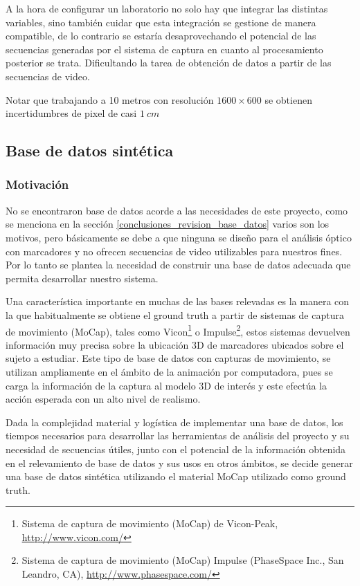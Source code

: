 A la hora de configurar un laboratorio no solo hay que integrar las distintas variables, sino también cuidar que esta integración se gestione de manera compatible, de lo contrario se estaría desaprovechando el potencial de las secuencias generadas por el sistema de captura en cuanto al procesamiento posterior se trata. Dificultando la tarea de obtención de datos a partir de las secuencias de video.

Notar que trabajando a 10 metros con resolución $1600\times600$ se obtienen incertidumbres de pixel de casi $1 ~cm $

\subsection{Base de datos sintética} \label{seccion_Base_Datos_Sintetica}
\subsubsection{Motivación}

No se encontraron base de datos acorde a las necesidades de este proyecto, como se menciona en la sección \ref{conclusiones_revision_base_datos} varios son los motivos, pero básicamente se debe a que ninguna se diseño para el análisis óptico  con marcadores y no ofrecen secuencias de video utilizables para nuestros fines. Por lo tanto se plantea la necesidad de construir una base de datos adecuada que permita desarrollar nuestro sistema.


Una característica importante en muchas de las bases relevadas es la manera con la que habitualmente se obtiene el ground truth a partir de sistemas de captura de movimiento (MoCap), tales como Vicon\footnote{ Sistema  de captura de movimiento (MoCap) de Vicon-Peak, \textcolor{blue}{\underline{\url{http://www.vicon.com/}}} }
 o Impulse\footnote{ Sistema  de captura de movimiento (MoCap) Impulse (PhaseSpace Inc., San Leandro, CA), \textcolor{blue}{\underline{\url{http://www.phasespace.com/}}} },
estos sistemas devuelven información muy precisa sobre la ubicación 3D de marcadores ubicados sobre el sujeto a estudiar. Este tipo de base de datos con capturas de movimiento, se utilizan ampliamente en el ámbito de la animación por computadora, pues se carga la información de la captura al modelo 3D de interés y este efectúa la acción esperada con un alto nivel de realismo. 


Dada la complejidad material y logística de implementar una base de datos, los tiempos necesarios para desarrollar las herramientas de análisis del proyecto y su necesidad de secuencias útiles, junto con el potencial de la información obtenida en el relevamiento de base de datos y sus usos en otros ámbitos, se decide generar una base de datos sintética utilizando el material MoCap utilizado como ground truth.


